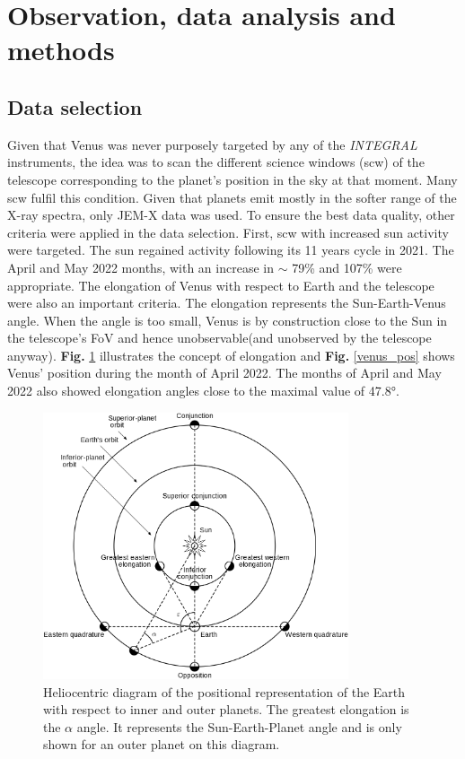 \section{Observation, data analysis and methods}

    \subsection{Data selection}
        Given that Venus was never purposely targeted by any of the \textit{INTEGRAL} instruments, the idea was to scan the different science windows (scw) of the
        telescope corresponding to the planet's position in the sky at that moment. Many scw fulfil this condition. Given that planets emit mostly in the softer range
        of the X-ray spectra, only JEM-X data was used\autocite{BhardwajX-raysObjects, Futaana2017SolarAtmosphere}. To ensure the best data quality, other criteria 
        were applied in the data selection. First, scw with increased sun activity were targeted. The sun regained activity following its 11 years cycle in 2021. 
        The April and May 2022 months, with an increase in $\sim$ 79\% and 107\% were appropriate. The elongation of Venus with respect to Earth and the telescope
        were also an important criteria. The elongation represents the Sun-Earth-Venus angle. When the angle is too small, Venus is by construction close to the Sun in the telescope's FoV and hence unobservable(and unobserved by the telescope anyway). \textbf{Fig.} \ref{elongation} illustrates the concept of elongation and \textbf{Fig.} \ref{venus_pos} shows Venus' position during the month of April 2022. The months of April and May 2022 also showed elongation angles close to the maximal value of 47.8°.

    \begin{figure}[H]
        \centering
        \includegraphics[width = 9cm]{report/Figures/methods/Positional_astronomy.png}
        \caption{Heliocentric diagram of the positional representation of the Earth with respect to inner and outer planets. The greatest elongation is the $\alpha$ angle. It represents the Sun-Earth-Planet angle and is only shown for an outer planet on this diagram.}
        \label{elongation}
    \end{figure}
    

